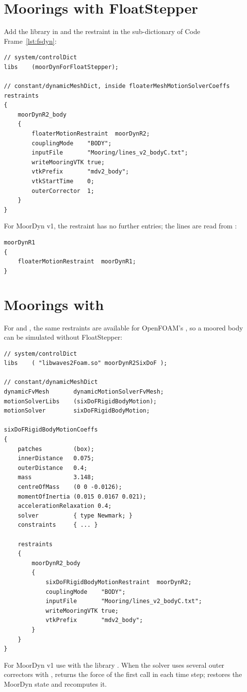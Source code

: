 \section{Moorings with FloatStepper}
Add the library in  and the restraint in the 
sub-dictionary of Code Frame~\ref{lst:fsdyn}:
\begin{lstlisting}[caption={MoorDyn v2 restraint for FloatStepper.},label={lst:fsmoor}]
// system/controlDict
libs    (moorDynForFloatStepper);

// constant/dynamicMeshDict, inside floaterMeshMotionSolverCoeffs
restraints
{
    moorDynR2_body
    {
        floaterMotionRestraint  moorDynR2;
        couplingMode    "BODY";
        inputFile       "Mooring/lines_v2_bodyC.txt";
        writeMooringVTK true;
        vtkPrefix       "mdv2_body";
        vtkStartTime    0;
        outerCorrector  1;
    }
}
\end{lstlisting}
For MoorDyn v1, the restraint has no further entries; the lines are read from
:
\begin{lstlisting}
moorDynR1
{
    floaterMotionRestraint  moorDynR1;
}
\end{lstlisting}

\section{Moorings with \texorpdfstring{}{sixDoFRigidBodyMotion}}
\label{sec:moordyn-sixdof}
For  and , the same restraints are available for OpenFOAM's
, so a moored body can be simulated without FloatStepper:
\begin{lstlisting}[caption={MoorDyn v2 restraint for \kw{sixDoFRigidBodyMotion}.},label={lst:sixdofmoor}]
// system/controlDict
libs    ( "libwaves2Foam.so" moorDynR2SixDoF );

// constant/dynamicMeshDict
dynamicFvMesh       dynamicMotionSolverFvMesh;
motionSolverLibs    (sixDoFRigidBodyMotion);
motionSolver        sixDoFRigidBodyMotion;

sixDoFRigidBodyMotionCoeffs
{
    patches         (box);
    innerDistance   0.075;
    outerDistance   0.4;
    mass            3.148;
    centreOfMass    (0 0 -0.0126);
    momentOfInertia (0.015 0.0167 0.021);
    accelerationRelaxation 0.4;
    solver          { type Newmark; }
    constraints     { ... }

    restraints
    {
        moorDynR2_body
        {
            sixDoFRigidBodyMotionRestraint  moorDynR2;
            couplingMode    "BODY";
            inputFile       "Mooring/lines_v2_bodyC.txt";
            writeMooringVTK true;
            vtkPrefix       "mdv2_body";
        }
    }
}
\end{lstlisting}
For MoorDyn v1 use  with the library
. When the solver uses several outer correctors with
,  returns the force of the first call in each time
step;  restores the MoorDyn state and recomputes it.

